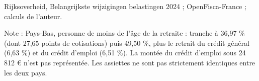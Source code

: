 Rijksoverheid, Belangrijkste wijzigingen belastingen 2024 ; OpenFisca-France ; calculs de l'auteur.\par Note : Pays-Bas, personne de moins de l'âge de la retraite : tranche à 36,97 \% (dont 27,65 points de cotisations) puis 49,50 \%, plus le retrait du crédit général (6,63 \%) et du crédit d'emploi (6,51 \%). La montée du crédit d'emploi sous 24 812 \euro{} n'est pas représentée. Les assiettes ne sont pas strictement identiques entre les deux pays.
